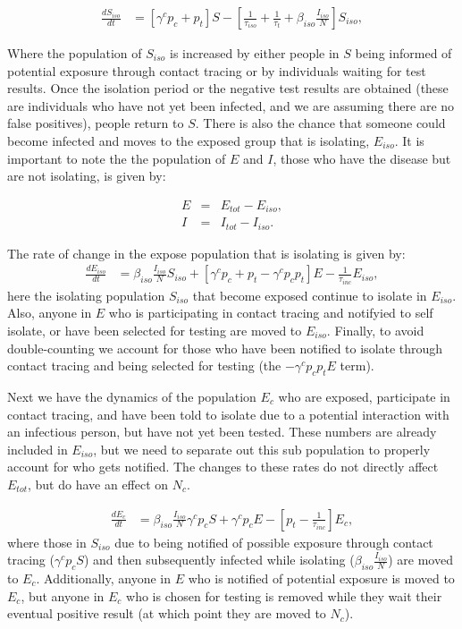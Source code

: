 \documentclass[notitlepage, superscriptaddress]{revtex4-2}
\begin{document}
\begin{eqnarray}
\label{E:dS_iso}
\frac{dS_{iso}}{dt} &= [\gamma^{c} p_{c}+ p_{t}] S - [\frac{1}{\tau_{iso}} + \frac{1}{\tau_t} + \beta_{iso} \frac{I_{iso}}{N}] S_{iso},
\end{eqnarray}

Where the population of $S_{iso}$ is increased by either people in $S$ being informed of potential exposure through contact tracing or by individuals waiting for test results. Once the isolation period or the negative test results are obtained (these are individuals who have not yet been infected, and we are assuming there are no false positives), people return to $S$. There is also the chance that someone could become infected and moves to the exposed group that is isolating, $E_{iso}$. It is important to note the the population of $E$ and $I$, those who have the disease but are not isolating, is given by:

\begin{eqnarray}
\label{E:Etot}
E &=& E_{tot} - E_{iso}, \\ 
I &=& I_{tot} - I_{iso}.
\end{eqnarray}

The rate of change in the expose population that is isolating is given by:
\begin{eqnarray}
\label{E:dE_iso}
\frac{dE_{iso}}{dt} &= \beta_{iso} \frac{I_{iso}}{N} S_{iso} +  [\gamma^{c} p_{c} + p_{t} - \gamma^{c} p_{c} p_{t}] E - \frac{1}{\tau_{inc}} E_{iso},
\end{eqnarray}
here the isolating population $S_{iso}$ that become exposed continue to isolate in $E_{iso}$. Also, anyone in $E$ who is participating in contact tracing and notifyied to self isolate, or have been selected for testing are moved to $E_{iso}$. Finally, to avoid double-counting we account for those who have been notified to isolate through contact tracing and being selected for testing (the $- \gamma^{c} p_{c} p_{t}E$ term). 

Next we have the dynamics of the population $E_{c}$ who are exposed, participate in contact tracing, and have been told to isolate due to a potential interaction with an infectious person, but have not yet been tested. These numbers are already included in $E_{iso}$, but we need to separate out this sub population to properly account for who gets notified. The changes to these rates do not directly affect $E_{tot}$, but do have an effect on $N_{c}$.

\begin{eqnarray}
\label{E:dE_c}
\frac{dE_{c}}{dt} &= \beta_{iso} \frac{I_{iso}}{N} \gamma^{c} p_{c} S +  \gamma^{c} p_{c} E  - [p_{t} - \frac{1}{\tau_{inc}}]E_{c},
\end{eqnarray}
where those in $S_{iso}$ due to being notified of possible exposure through contact tracing ($\gamma^{c} p_{c} S$) and then subsequently infected while isolating ($\beta_{iso} \frac{I_{iso}}{N}$) are moved to $E_{c}$. Additionally, anyone in $E$ who is notified of potential exposure is moved to $E_c$, but anyone in $E_c$ who is chosen for testing is removed while they wait their eventual positive result (at which point they are moved to $N_c$).
\end{document}
